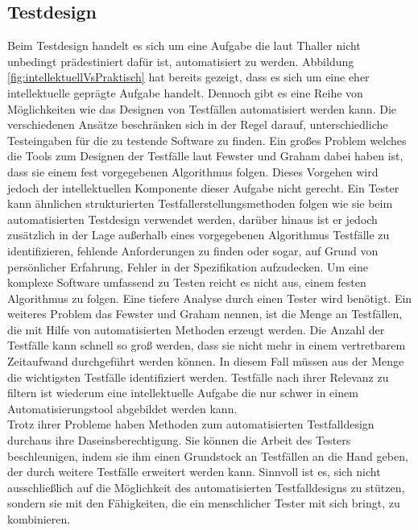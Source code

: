 \subsection{Testdesign}
\label{subsec:testdesign}
Beim Testdesign handelt es sich um eine Aufgabe die laut Thaller \cite[vgl. S. 231]{thaller_software-test_2002} nicht unbedingt prädestiniert dafür ist, automatisiert zu werden. Abbildung \ref{fig:intellektuellVsPraktisch} hat bereits gezeigt, dass es sich um eine eher intellektuelle geprägte Aufgabe handelt.
Dennoch gibt es eine Reihe von Möglichkeiten wie das Designen von Testfällen automatisiert werden kann. Die verschiedenen Ansätze beschränken sich in der Regel darauf, unterschiedliche Testeingaben für die zu testende Software zu finden.
Ein großes Problem welches die Tools zum Designen der Testfälle laut Fewster und Graham \cite[vgl. S. 19]{fewster_software_1999} dabei haben ist, dass sie einem fest vorgegebenen Algorithmus folgen. Dieses Vorgehen wird jedoch der intellektuellen Komponente dieser Aufgabe nicht gerecht. Ein Tester kann ähnlichen strukturierten Testfallerstellungsmethoden folgen wie sie beim automatisierten Testdesign verwendet werden, darüber hinaus ist er jedoch zusätzlich in der Lage außerhalb eines vorgegebenen Algorithmus Testfälle zu identifizieren, fehlende Anforderungen zu finden oder sogar, auf Grund von persönlicher Erfahrung, Fehler in der Spezifikation aufzudecken. Um eine komplexe Software umfassend zu Testen reicht es nicht aus, einem festen Algorithmus zu folgen. Eine tiefere Analyse durch einen Tester wird benötigt. 
Ein weiteres Problem das Fewster und Graham \cite[vgl. S. 19]{fewster_software_1999} nennen, ist die Menge an Testfällen, die mit Hilfe von automatisierten Methoden erzeugt werden. Die Anzahl der Testfälle kann schnell so groß werden, dass sie nicht mehr in einem vertretbarem Zeitaufwand durchgeführt werden können. In diesem Fall müssen aus der Menge die wichtigsten Testfälle identifiziert werden. Testfälle nach ihrer Relevanz zu filtern ist wiederum eine intellektuelle Aufgabe die nur schwer in einem Automatisierungstool abgebildet werden kann.\\
Trotz ihrer Probleme haben Methoden zum automatisierten Testfalldesign durchaus ihre Daseinsberechtigung. Sie können die Arbeit des Testers beschleunigen, indem sie ihm einen Grundstock an Testfällen an die Hand geben, der durch weitere Testfälle erweitert werden kann. Sinnvoll ist es, sich nicht ausschließlich auf die Möglichkeit des automatisierten Testfalldesigns zu stützen, sondern sie mit den Fähigkeiten, die ein menschlicher Tester mit sich bringt, zu kombinieren.\\

